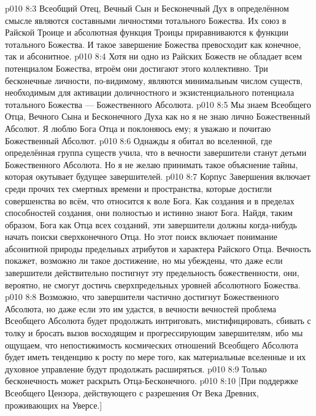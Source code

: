 \vs p010 8:3 \pc Всеобщий Отец, Вечный Сын и Бесконечный Дух в определённом смысле являются составными личностями тотального Божества. Их союз в Райской Троице и абсолютная функция Троицы приравниваются к функции тотального Божества. И такое завершение Божества превосходит как конечное, так и абсонитное.
\vs p010 8:4 Хотя ни одно из Райских Божеств не обладает всем потенциалом Божества, втроём они достигают этого коллективно. Три бесконечные личности, по\hyp{}видимому, являются минимальным числом существ, необходимым для активации доличностного и экзистенциального потенциала тотального Божества --- Божественного Абсолюта.
\vs p010 8:5 Мы знаем Всеобщего Отца, Вечного Сына и Бесконечного Духа как  но я не знаю лично Божественный Абсолют. Я люблю Бога Отца и поклоняюсь ему; я уважаю и почитаю Божественный Абсолют.
\vs p010 8:6 \pc Однажды я обитал во вселенной, где определённая группа существ учила, что в вечности завершители станут детьми Божественного Абсолюта. Но я не желаю принимать такое объяснение тайны, которая окутывает будущее завершителей.
\vs p010 8:7 Корпус Завершения включает среди прочих тех смертных времени и пространства, которые достигли совершенства во всём, что относится к воле Бога. Как создания и в пределах способностей создания, они полностью и истинно знают Бога. Найдя, таким образом, Бога как Отца всех созданий, эти завершители должны когда\hyp{}нибудь начать поиски сверхконечного Отца. Но этот поиск включает понимание абсонитной природы предельных атрибутов и характера Райского Отца. Вечность покажет, возможно ли такое достижение, но мы убеждены, что даже если завершители действительно постигнут эту предельность божественности, они, вероятно, не смогут достичь сверхпредельных уровней абсолютного Божества.
\vs p010 8:8 Возможно, что завершители частично достигнут Божественного Абсолюта, но даже если это им удастся, в вечности вечностей проблема Всеобщего Абсолюта будет продолжать интриговать, мистифицировать, сбивать с толку и бросать вызов восходящим и прогрессирующим завершителям, ибо мы ощущаем, что непостижимость космических отношений Всеобщего Абсолюта будет иметь тенденцию к росту по мере того, как материальные вселенные и их духовное управление будут продолжать расширяться.
\vs p010 8:9 \pc Только бесконечность может раскрыть Отца\hyp{}Бесконечного.
\vsetoff
\vs p010 8:10 [При поддержке Всеобщего Цензора, действующего с разрешения От Века Древних, проживающих на Уверсе.]
\quizlink
